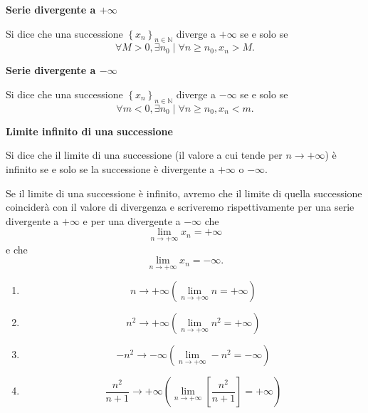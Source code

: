 \begin{definition}
    \textbf{Serie divergente a $+\infty$}

    Si dice che una successione $\left\{x_n\right\}_{n\in\mathbb{N}}$ diverge a $+\infty$
    se e solo se
    \[
        \forall M > 0, \exists n_0 \mid \forall n \geq n_0, x_n > M.
    \]
\end{definition}

\begin{definition}
    \textbf{Serie divergente a $-\infty$}

    Si dice che una successione $\left\{x_n\right\}_{n\in\mathbb{N}}$ diverge a $-\infty$
    se e solo se
    \[
        \forall m < 0, \exists n_0 \mid \forall n \geq n_0, x_n < m.
    \]
\end{definition}

\begin{definition}
    \textbf{Limite infinito di una successione}

    Si dice che il limite di una successione (il valore a cui tende per $n\rightarrow
    +\infty$) è infinito se e solo se la successione è divergente a $+\infty$ o $-\infty$.

    Se il limite di una successione è infinito, avremo che il limite di quella successione
    coinciderà con il valore di divergenza e scriveremo rispettivamente per una serie
    divergente a $+\infty$ e per una divergente a $-\infty$ che
    \[
        \underset{n\rightarrow+\infty}{\lim} x_n = +\infty
    \]
    e che
    \[
        \underset{n\rightarrow+\infty}{\lim} x_n = -\infty.
    \]

\end{definition}

\begin{example}\leavevmode

    \begin{enumerate}[label=(\roman*)]
        \item \[
            n \rightarrow +\infty \left(\underset{n\rightarrow+\infty}{\lim}n=+\infty\right)
        \]
        \item \[
            n^2 \rightarrow +\infty\left(\underset{n\rightarrow+\infty}{\lim}n^2=+\infty\right)
        \]
        \item \[
            -n^2 \rightarrow -\infty\left(\underset{n\rightarrow+\infty}{\lim}-n^2=-\infty\right)
        \]
        \item \[
            \frac{n^2}{n+1} \rightarrow +\infty
            \left(\underset{n\rightarrow+\infty}{\lim}\left[\frac{n^2}{n+1}\right]=+\infty\right)
        \]
    \end{enumerate}
\end{example}